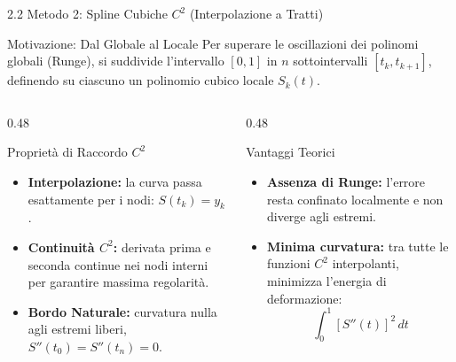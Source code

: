 \documentclass[aspectratio=169, 10pt]{beamer}
\begin{document}
\begin{frame}{2.2 Metodo 2: Spline Cubiche $C^2$ (Interpolazione a Tratti)}
    \begin{block}{Motivazione: Dal Globale al Locale}
        Per superare le oscillazioni dei polinomi globali (Runge), si suddivide l'intervallo $[0, 1]$ in $n$ sottointervalli $[t_k, t_{k+1}]$, definendo su ciascuno un polinomio cubico locale $S_k(t)$.
    \end{block}
    \begin{columns}[T]
        \begin{column}{0.48\textwidth}
            \begin{exampleblock}{Proprietà di Raccordo $C^2$}
                \footnotesize
                \begin{itemize}
                    \item \textbf{Interpolazione:} la curva passa esattamente per i nodi: $S(t_k) = y_k$.
                    \item \textbf{Continuità $C^2$:} derivata prima e seconda continue nei nodi interni per garantire massima regolarità.
                    \item \textbf{Bordo Naturale:} curvatura nulla agli estremi liberi, $S''(t_0) = S''(t_n) = 0$.
                \end{itemize}
            \end{exampleblock}
        \end{column}
        \begin{column}{0.48\textwidth}
            \begin{block}{Vantaggi Teorici}
                \footnotesize
                \begin{itemize}
                    \item \textbf{Assenza di Runge:} l'errore resta confinato localmente e non diverge agli estremi.
                    \item \textbf{Minima curvatura:} tra tutte le funzioni $C^2$ interpolanti, minimizza l'energia di deformazione:
                    $$\int_0^1 [S''(t)]^2 \, dt$$
                \end{itemize}
            \end{block}
        \end{column}
    \end{columns}
\end{frame}
\end{document}
